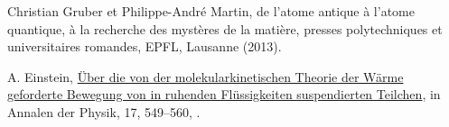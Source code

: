 \begin{thebibliography}{99.}%

 Christian Gruber et Philippe-André Martin, de l'atome antique à l'atome quantique, \`a la recherche des mystères de la matière, presses polytechniques et universitaires romandes, EPFL, Lausanne (2013).

 A. Einstein, \href{http://myweb.rz.uni-augsburg.de/~eckern/adp/history/einstein-papers/1905_17_549-560.pdf}{\"Uber die von der molekularkinetischen Theorie der W\"arme geforderte Bewegung von in ruhenden Fl\"ussigkeiten suspendierten Teilchen}, in Annalen der Physik, 17, 549–560, .

\end{thebibliography}
